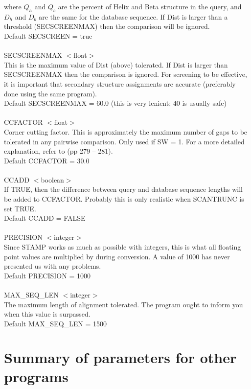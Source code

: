 where $Q_{h}$ and $Q_{b}$ are the percent of Helix and Beta
structure in the query, and $D_{h}$ and $D_{b}$ are the same for the
database sequence.  If Dist is larger than a threshold
(SECSCREENMAX) then the comparison will be ignored.\\
Default SECSCREEN = true\\
\\
SECSCREENMAX $<$float$>$\\
This is the maximum value of Dist (above) tolerated.  If Dist is
larger than SECSCREENMAX then the comparison is ignored.  For
screening to be effective, it is important that secondary structure
assignments are accurate (preferably done using the same program).\\
Default SECSCREENMAX = 60.0 (this is very lenient; 40 is usually safe)\\
\\
CCFACTOR $<$float$>$\\
Corner cutting factor.  This is approximately the maximum number of
gaps to be tolerated in any pairwise comparison.  Only used if SW = 1.
For a more  detailed explanation, refer to \cite{timewarps} (pp 
279 -- 281).\\
Default CCFACTOR = 30.0\\
\\
CCADD $<$boolean$>$\\
If TRUE, then the difference between query and database sequence
lengths will be added to CCFACTOR.  Probably this is only realistic
when SCANTRUNC is set TRUE.\\
Default CCADD = FALSE\\
\\
PRECISION $<$integer$>$\\
Since STAMP works as much as possible with integers, this is what
all floating point values are multiplied by during conversion.  A
value of 1000 has never presented us with any problems.\\
Default PRECISION = 1000\\
\\
MAX\_SEQ\_LEN $<$integer$>$\\
The maximum length of alignment tolerated.  The program ought to 
inform you when this value is surpassed.\\
Default MAX\_SEQ\_LEN = 1500\\

\section{Summary of parameters for other programs}

